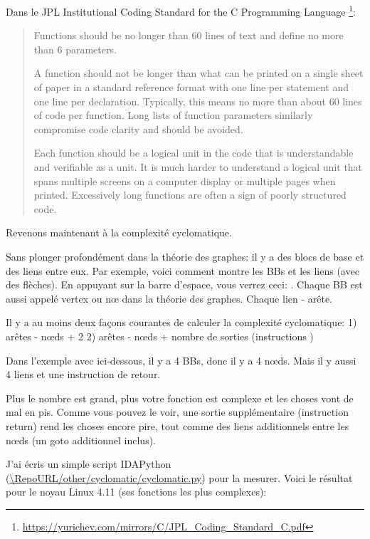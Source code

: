 Dans le JPL Institutional Coding Standard for the C Programming Language%
\footnote{\url{https://yurichev.com/mirrors/C/JPL_Coding_Standard_C.pdf}}:

\begin{framed}
\begin{quotation}
Functions should be no longer than 60 lines of text and define no more than 6 parameters.

A function should not be longer than what can be printed on a single sheet of paper in a standard reference format with one line per statement and one line per declaration. Typically, this means no more than about 60 lines of code per function. Long lists of function parameters similarly compromise code clarity and should be avoided.

Each function should be a logical unit in the code that is understandable and verifiable as a unit. It is much harder to understand a logical unit that spans multiple screens on a computer display or multiple pages when printed. Excessively long functions are often a sign of poorly structured code.
\end{quotation}
\end{framed}

Revenons maintenant à la complexité cyclomatique.

Sans plonger profondément dans la théorie des graphes: il y a des blocs de base
et des liens entre eux.
Par exemple, voici comment \IDA montre les \ac{BB}s et les liens (avec des flèches).
En appuyant sur la barre d'espace, vous verrez ceci: .
Chaque \ac{BB} est aussi appelé vertex ou n\oe{} dans la théorie des graphes.
Chaque lien - arête.

Il y a au moins deux façons courantes de calculer la complexité cyclomatique:
1) arêtes - n\oe{}ds + 2
2) arêtes - n\oe{}ds + nombre de sorties (instructions )

Dans l'exemple avec \IDA ici-dessous, il y a 4 \ac{BB}s, donc il y a 4 n\oe{}ds.
Mais il y aussi 4 liens et une instruction de retour.

Plus le nombre est grand, plus votre fonction est complexe et les choses vont de
mal en pis.
Comme vous pouvez le voir, une sortie supplémentaire (instruction return) rend
les choses encore pire, tout comme des liens additionnels entre les n\oe{}ds (un
goto additionnel inclus).

J'ai écris un simple script IDAPython (\url{\RepoURL/other/cyclomatic/cyclomatic.py})
pour la mesurer.
Voici le résultat pour le noyau Linux 4.11 (ses fonctions les plus complexes):

